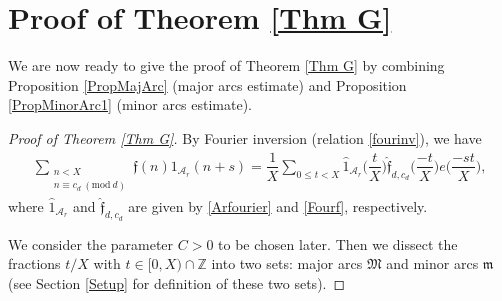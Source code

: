 \documentclass[12pt]{amsart}
\numberwithin{equation}{section}
\theoremstyle{remark}
\theoremstyle{definition}
\newcommand{\imod}[1]{\ (\mathrm{mod}\ #1)}
\begin{document}
\section{Proof of Theorem \ref{Thm G} }\label{sec: proof of gen}

We are now ready to give the proof of Theorem \ref{Thm G} by combining Proposition \ref{PropMajArc} (major arcs estimate) and Proposition \ref{PropMinorArc1} (minor arcs estimate).


\begin{proof}[Proof of Theorem \ref{Thm G}]
By Fourier inversion (relation \eqref{fourinv}), we have
\begin{align}
\label{Thm7eq1} \sum_{\substack{n < X\\n\equiv c_d \imod d}}\mathfrak{f}(n)1_{\mathcal{A}_r}(n+s) = \dfrac{1}{X}\sum_{0\leq t<X}\widehat{1}_{\mathcal{A}_r}\bigg(\dfrac{t}{X}\bigg)\widehat{\mathfrak{f}}_{d, c_d}\bigg(\dfrac{-t}{X}\bigg)e\bigg(\dfrac{-st}{X}\bigg),
\end{align}
where $\widehat{1}_{\mathcal{A}_r}$ and $\widehat{\mathfrak{f}}_{d, c_d}$ are given by \eqref{Arfourier} and \eqref{Fourf}, respectively.

We consider the parameter $C>0$ to be chosen later. Then we dissect the fractions $t/X$ with $t\in [0, X)\cap \mathbb{Z}$ into two sets: major arcs $\mathfrak{M}$ and minor arcs $\mathfrak{m}$ (see Section \ref{Setup} for definition of these two sets).


\end{proof}
\end{document}
